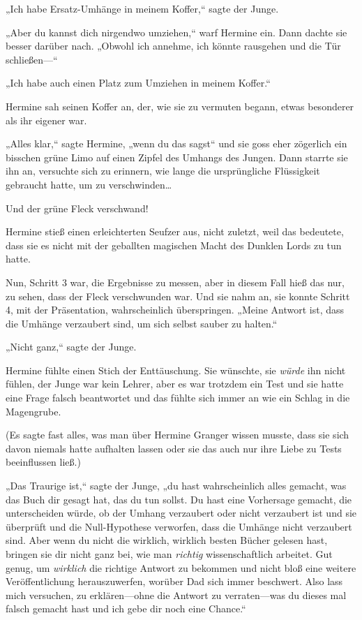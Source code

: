 {„Ich habe Ersatz-Umhänge in meinem Koffer,“ sagte der Junge.

„Aber du kannst dich nirgendwo umziehen,“ warf Hermine ein. Dann dachte sie besser darüber nach. „Obwohl ich annehme, ich könnte rausgehen und die Tür schließen—“

„Ich habe auch einen Platz zum Umziehen in meinem Koffer.“

Hermine sah seinen Koffer an, der, wie sie zu vermuten begann, etwas besonderer als ihr eigener war.

„Alles klar,“ sagte Hermine, „wenn du das sagst“ und sie goss eher zögerlich ein bisschen grüne Limo auf einen Zipfel des Umhangs des Jungen. Dann starrte sie ihn an, versuchte sich zu erinnern, wie lange die ursprüngliche Flüssigkeit gebraucht hatte, um zu verschwinden…

Und der grüne Fleck verschwand!

Hermine stieß einen erleichterten Seufzer aus, nicht zuletzt, weil das bedeutete, dass sie es nicht mit der geballten magischen Macht des Dunklen Lords zu tun hatte.

Nun, Schritt 3 war, die Ergebnisse zu messen, aber in diesem Fall hieß das nur, zu sehen, dass der Fleck verschwunden war. Und sie nahm an, sie konnte Schritt 4, mit der Präsentation, wahrscheinlich überspringen. „Meine Antwort ist, dass die Umhänge verzaubert sind, um sich selbst sauber zu halten.“

„Nicht ganz,“ sagte der Junge.

Hermine fühlte einen Stich der Enttäuschung. Sie wünschte, sie \emph{würde} ihn nicht fühlen, der Junge war kein Lehrer, aber es war trotzdem ein Test und sie hatte eine Frage falsch beantwortet und das fühlte sich immer an wie ein Schlag in die Magengrube.

(Es sagte fast alles, was man über Hermine Granger wissen musste, dass sie sich davon niemals hatte aufhalten lassen oder sie das auch nur ihre Liebe zu Tests beeinflussen ließ.)

„Das Traurige ist,“ sagte der Junge, „du hast wahrscheinlich alles gemacht, was das Buch dir gesagt hat, das du tun sollst. Du hast eine Vorhersage gemacht, die unterscheiden würde, ob der Umhang verzaubert oder nicht verzaubert ist und sie überprüft und die Null-Hypothese verworfen, dass die Umhänge nicht verzaubert sind. Aber wenn du nicht die wirklich, wirklich besten Bücher gelesen hast, bringen sie dir nicht ganz bei, wie man \emph{richtig} wissenschaftlich arbeitet. Gut genug, um \emph{wirklich} die richtige Antwort zu bekommen und nicht bloß eine weitere Veröffentlichung herauszuwerfen, worüber Dad sich immer beschwert. Also lass mich versuchen, zu erklären—ohne die Antwort zu verraten—was du dieses mal falsch gemacht hast und ich gebe dir noch eine Chance.“

}

